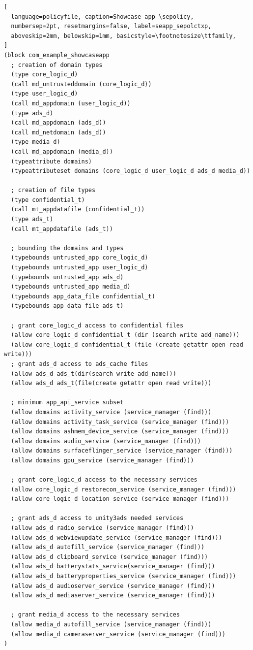 \begin{lstlisting}[
  language=policyfile, caption=Showcase app \sepolicy,
  numbersep=2pt, resetmargins=false, label=seapp_sepolctxp,
  aboveskip=2mm, belowskip=1mm, basicstyle=\footnotesize\ttfamily,
]
(block com_example_showcaseapp
  ; creation of domain types
  (type core_logic_d)
  (call md_untrusteddomain (core_logic_d))
  (type user_logic_d)
  (call md_appdomain (user_logic_d))
  (type ads_d)
  (call md_appdomain (ads_d))
  (call md_netdomain (ads_d))
  (type media_d)
  (call md_appdomain (media_d))
  (typeattribute domains)
  (typeattributeset domains (core_logic_d user_logic_d ads_d media_d))

  ; creation of file types
  (type confidential_t)
  (call mt_appdatafile (confidential_t))
  (type ads_t)
  (call mt_appdatafile (ads_t))

  ; bounding the domains and types
  (typebounds untrusted_app core_logic_d)
  (typebounds untrusted_app user_logic_d)
  (typebounds untrusted_app ads_d)
  (typebounds untrusted_app media_d)	
  (typebounds app_data_file confidential_t)
  (typebounds app_data_file ads_t)

  ; grant core_logic_d access to confidential files
  (allow core_logic_d confidential_t (dir (search write add_name)))
  (allow core_logic_d confidential_t (file (create getattr open read write)))
  ; grant ads_d access to ads_cache files
  (allow ads_d ads_t(dir(search write add_name)))
  (allow ads_d ads_t(file(create getattr open read write)))

  ; minimum app_api_service subset
  (allow domains activity_service (service_manager (find)))
  (allow domains activity_task_service (service_manager (find)))
  (allow domains ashmem_device_service (service_manager (find)))
  (allow domains audio_service (service_manager (find)))
  (allow domains surfaceflinger_service (service_manager (find)))
  (allow domains gpu_service (service_manager (find)))

  ; grant core_logic_d access to the necessary services
  (allow core_logic_d restorecon_service (service_manager (find)))
  (allow core_logic_d location_service (service_manager (find)))

  ; grant ads_d access to unity3ads needed services
  (allow ads_d radio_service (service_manager (find)))
  (allow ads_d webviewupdate_service (service_manager (find)))
  (allow ads_d autofill_service (service_manager (find)))
  (allow ads_d clipboard_service (service_manager (find)))
  (allow ads_d batterystats_service(service_manager (find)))
  (allow ads_d batteryproperties_service (service_manager (find)))
  (allow ads_d audioserver_service (service_manager (find)))
  (allow ads_d mediaserver_service (service_manager (find)))

  ; grant media_d access to the necessary services
  (allow media_d autofill_service (service_manager (find)))
  (allow media_d cameraserver_service (service_manager (find)))
)
\end{lstlisting}


